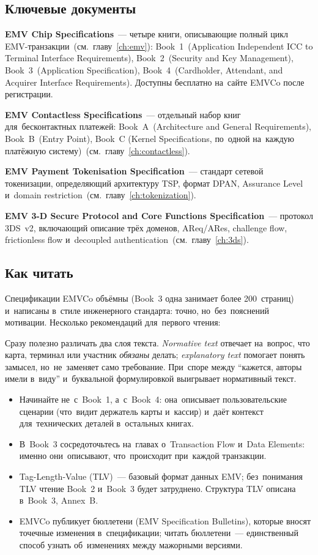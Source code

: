 \subsection*{Ключевые документы}

\textbf{EMV Chip Specifications}~--- четыре книги, описывающие
полный цикл EMV-транзакции~(см.~главу~\ref{ch:emv}):
Book~1~(Application Independent ICC to Terminal Interface
Requirements), Book~2~(Security and Key Management),
Book~3~(Application Specification), Book~4~(Cardholder,
Attendant, and Acquirer Interface Requirements). Доступны
бесплатно на~сайте EMVCo после регистрации.

\textbf{EMV Contactless Specifications}~--- отдельный набор
книг для~бесконтактных платежей: Book~A~(Architecture and
General Requirements), Book~B~(Entry Point), Book~C
(Kernel Specifications, по~одной на~каждую платёжную
систему)~(см.~главу~\ref{ch:contactless}).

\textbf{EMV Payment Tokenisation Specification}~--- стандарт
сетевой токенизации, определяющий архитектуру TSP, формат
DPAN, Assurance Level и~domain
restriction~(см.~главу~\ref{ch:tokenization}).

\textbf{EMV 3-D Secure Protocol and Core Functions
  Specification}~--- протокол 3DS~v2, включающий описание
трёх доменов, AReq/ARes, challenge flow, frictionless flow
и~decoupled authentication~(см.~главу~\ref{ch:3ds}).

\subsection*{Как читать}

Спецификации EMVCo объёмны (Book~3 одна занимает более 200~страниц)
и~написаны в~стиле инженерного стандарта: точно, но~без~пояснений
мотивации. Несколько рекомендаций для~первого чтения:

Сразу полезно различать два слоя текста. \emph{Normative text}
отвечает на~вопрос, что карта, терминал или участник \emph{обязаны}
делать; \emph{explanatory text} помогает понять замысел, но~не~заменяет
само требование. При~споре между \enquote{кажется, авторы имели в~виду}
и~буквальной формулировкой выигрывает нормативный текст.

\begin{itemize}
  \item Начинайте не~с~Book~1, а~с~Book~4: она~описывает
        пользовательские сценарии (что~видит держатель карты
        и~кассир) и~даёт контекст для~технических деталей
        в~остальных книгах.
  \item В~Book~3 сосредоточьтесь на~главах о~Transaction Flow
        и~Data Elements: именно они~описывают, что~происходит
        при~каждой транзакции.
  \item Tag-Length-Value (TLV)~--- базовый формат данных EMV;
        без~понимания TLV чтение Book~2 и~Book~3 будет
        затруднено. Структура TLV описана в~Book~3,
        Annex~B.
  \item EMVCo публикует бюллетени (EMV Specification Bulletins),
        которые вносят точечные изменения в~спецификации;
        читать бюллетени~--- единственный способ узнать
        об~изменениях между мажорными версиями.
\end{itemize}

